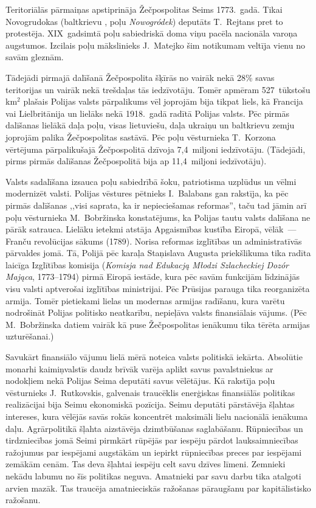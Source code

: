 \documentclass[twoside,a5paper,12pt,fleqn,openany]{extbook}
\newcommand{\pltxti}[1]{\textit{\textpolish{#1}}}
\newcommand{\betxti}[1]{\textit{\textbelarusian{#1}}}
\begin{document}
Teritoriālās pārmaiņas apstiprināja Žečpospolitas Seims 1773.~gadā. Tikai Novogrudokas (baltkrievu \betxti{Навагрудак}, poļu \pltxti{Nowogródek}) deputāts T.~Rejtans pret to protestēja. XIX~gadsimtā poļu sabiedriskā doma viņu pacēla nacionāla varoņa augstumos. Izcilais poļu mākslinieks J.~Matejko šim notikumam veltīja vienu no savām gleznām.

Tādejādi pirmajā dalīšanā Žečpospolita šķīrās no vairāk nekā 28\% savas teritorijas un vairāk nekā trešdaļas tās iedzīvotāju. Tomēr apmēram 527~tūkstošu km$^{2}$ plašais Polijas valsts pārpalikums vēl joprojām bija tikpat liels, kā Francija vai Lielbritānija un lielāks nekā 1918.~gadā radītā Polijas valsts. Pēc pirmās dalīšanas lielākā daļa poļu, visas lietuviešu, daļa ukraiņu un baltkrievu zemju joprojām palika Žečpospolitas sastāvā. Pēc poļu vēsturnieka T.~Korzona vērtējuma pārpalikušajā Žečpospolitā dzīvoja 7,4~miljoni iedzīvotāju. (Tādejādi, pirms pirmās dalīšanas Žečpospolitā bija ap 11,4~miljoni iedzīvotāju).

Valsts sadalīšana izsauca poļu sabiedrībā šoku, patriotisma uzplūdus un vēlmi modernizēt valsti. Polijas vēstures pētnieks I.~Balabans gan rakstīja, ka pēc pirmās dalīšanas ,,visi saprata, ka ir nepieciešamas reformas'', taču tad jāmin arī poļu vēsturnieka M.~Bobržinska konstatējums, ka Polijas tautu valsts dalīšana ne pārāk satrauca. Lielāku ietekmi atstāja Apgaismības kustība Eiropā, vēlāk~--- Franču revolūcijas sākums (1789). Norisa reformas izglītības un administratīvās pārvaldes jomā. Tā, Polijā pēc karaļa Staņislava Augusta priekšlikuma tika radīta laicīga Izglītības komisija (\pltxti{Komisja nad Edukacją Młodzi Szlacheckiej Dozór Mająca}, 1773--1794) pirmā Eiropā iestāde, kura pēc savām funkcijām līdzinājās visu valsti aptverošai izglītības ministrijai. Pēc Prūsijas parauga tika reorganizēta armija. Tomēr pietiekami lielas un modernas armijas radīšanu, kura varētu nodrošināt Polijas politisko neatkarību, nepieļāva valsts finansiālais vājums. (Pēc M.~Bobržinska datiem vairāk kā puse Žečpospolitas ienākumu tika tērēta armijas uzturēšanai.)

Savukārt finansiālo vājumu lielā mērā noteica valsts politiskā iekārta. Absolūtie monarhi kaimiņvalstīs daudz brīvāk varēja aplikt savus pavalstniekus ar nodokļiem nekā Polijas Seima deputāti savus vēlētājus. Kā rakstīja poļu vēsturnieks J.~Rutkovskis, galvenais traucēklis enerģiskas finansiālās politikas realizācijai bija Seimu ekonomiskā pozīcija. Seimu deputāti pārstāvēja šļahtas intereses, kura vēlējās savās rokās koncentrēt maksimāli lielu nacionālā ienākuma daļu. Agrārpolitikā šļahta aizstāvēja dzimtbūšanas saglabāšanu. Rūpniecības un tirdzniecības jomā Seimi pirmkārt rūpējās par iespēju pārdot lauksaimniecības ražojumus par iespējami augstākām un iepirkt rūpniecības preces par iespējami zemākām cenām. Tas deva šļahtai iespēju celt savu dzīves līmeni. Zemnieki nekādu labumu no šīs politikas neguva. Amatnieki par savu darbu tika atalgoti arvien mazāk. Tas traucēja amatnieciskās ražošanas pāraugšanu par kapitālistisko ražošanu.
\end{document}
